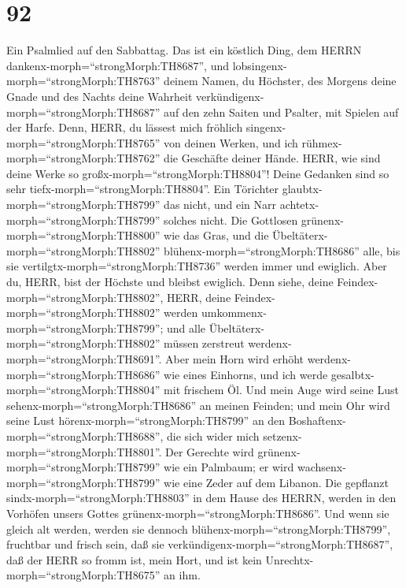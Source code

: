 \hypertarget{section-91}{%
\section{92}\label{section-91}}

 Ein Psalmlied auf den Sabbattag. Das ist ein köstlich Ding,
dem HERRN dankenx-morph=``strongMorph:TH8687'', und
lobsingenx-morph=``strongMorph:TH8763'' deinem Namen, du Höchster,
 des Morgens deine Gnade und des Nachts deine Wahrheit
verkündigenx-morph=``strongMorph:TH8687''  auf den zehn
Saiten und Psalter, mit Spielen auf der Harfe.  Denn, HERR,
du lässest mich fröhlich singenx-morph=``strongMorph:TH8765'' von deinen
Werken, und ich rühmex-morph=``strongMorph:TH8762'' die Geschäfte deiner
Hände.  HERR, wie sind deine Werke so
großx-morph=``strongMorph:TH8804''! Deine Gedanken sind so sehr
tiefx-morph=``strongMorph:TH8804''.  Ein Törichter
glaubtx-morph=``strongMorph:TH8799'' das nicht, und ein Narr
achtetx-morph=``strongMorph:TH8799'' solches nicht.  Die
Gottlosen grünenx-morph=``strongMorph:TH8800'' wie das Gras, und die
Übeltäterx-morph=``strongMorph:TH8802''
blühenx-morph=``strongMorph:TH8686'' alle, bis sie
vertilgtx-morph=``strongMorph:TH8736'' werden immer und ewiglich.
 Aber du, HERR, bist der Höchste und bleibst ewiglich.
 Denn siehe, deine Feindex-morph=``strongMorph:TH8802'',
HERR, deine Feindex-morph=``strongMorph:TH8802'' werden
umkommenx-morph=``strongMorph:TH8799''; und alle
Übeltäterx-morph=``strongMorph:TH8802'' müssen zerstreut
werdenx-morph=``strongMorph:TH8691''.  Aber mein Horn wird
erhöht werdenx-morph=``strongMorph:TH8686'' wie eines Einhorns, und ich
werde gesalbtx-morph=``strongMorph:TH8804'' mit frischem Öl.
 Und mein Auge wird seine Lust
sehenx-morph=``strongMorph:TH8686'' an meinen Feinden; und mein Ohr wird
seine Lust hörenx-morph=``strongMorph:TH8799'' an den
Boshaftenx-morph=``strongMorph:TH8688'', die sich wider mich
setzenx-morph=``strongMorph:TH8801''.  Der Gerechte wird
grünenx-morph=``strongMorph:TH8799'' wie ein Palmbaum; er wird
wachsenx-morph=``strongMorph:TH8799'' wie eine Zeder auf dem Libanon.
 Die gepflanzt sindx-morph=``strongMorph:TH8803'' in dem
Hause des HERRN, werden in den Vorhöfen unsers Gottes
grünenx-morph=``strongMorph:TH8686''.  Und wenn sie gleich
alt werden, werden sie dennoch blühenx-morph=``strongMorph:TH8799'',
fruchtbar und frisch sein,  daß sie
verkündigenx-morph=``strongMorph:TH8687'', daß der HERR so fromm ist,
mein Hort, und ist kein Unrechtx-morph=``strongMorph:TH8675'' an ihm.

